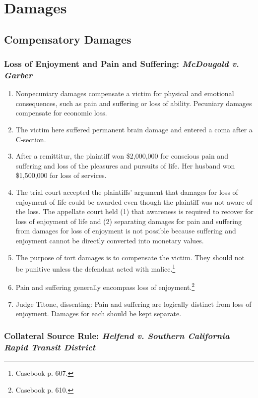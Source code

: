 \section{Damages}

\subsection{Compensatory Damages}
 
\subsubsection{Loss of Enjoyment and Pain and Suffering: \emph{McDougald v.  
Garber}}

\begin{enumerate}
    \item Nonpecuniary damages compensate a victim for physical and emotional 
    consequences, such as pain and suffering or loss of ability. Pecuniary 
    damages compensate for economic loss.
    \item The victim here suffered permanent brain damage and entered a coma 
    after a C-section.
    \item After a remittitur, the plaintiff won \$2,000,000 for conscious pain 
    and suffering and loss of the pleasures and pursuits of life. Her husband 
    won \$1,500,000 for loss of services.
    \item The trial court accepted the plaintiffs' argument that damages for 
    loss of enjoyment of life could be awarded even though the plaintiff was not 
    aware of the loss. The appellate court held (1) that awareness is required 
    to recover for loss of enjoyment of life and (2) separating damages for pain 
    and suffering from damages for loss of enjoyment is not possible because 
    suffering and enjoyment cannot be directly converted into monetary values.
    \item The purpose of tort damages is to compensate the victim. They should 
    not be punitive unless the defendant acted with malice.\footnote{Casebook p. 
    607.}
    \item Pain and suffering generally encompass loss of 
    enjoyment.\footnote{Casebook p. 610.}
    \item Judge Titone, dissenting: Pain and suffering are logically distinct 
    from loss of enjoyment. Damages for each should be kept separate.
\end{enumerate}

\subsubsection{Collateral Source Rule: \emph{Helfend v. Southern California 
Rapid Transit District}}

